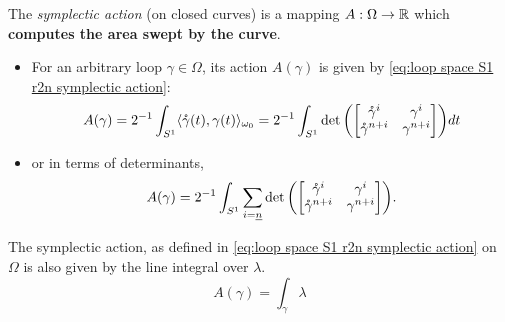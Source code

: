 \documentclass[../main-v2-manifolds.tex]{subfiles}
\begin{document}
\begin{definition}\label{def:symplectic action closed curves}
    The \emph{symplectic action} (on closed curves) is a mapping $A:\Omega\to\mathbb{R}$ which \textbf{computes the area swept by the curve}. 
    \begin{itemize}
        \item For an arbitrary loop $\gamma\in\Omega$, its action $A(\gamma)$ is given by \cref{eq:loop space S1 r2n symplectic action}:
        \begin{equation}
            A(\gamma) = 2^{-1}\int_{S^1}\langle\mathring{\gamma}(t),\gamma(t)\rangle_{\omega_0} = 2^{-1}\int_{S^1}\det\qty(\mqty[\mathring{\gamma}^{i} & \gamma^{i}\\ \mathring{\gamma}^{n+i} & \gamma^{n+i}])dt
            \label{eq:loop space S1 r2n symplectic action}
        \end{equation}
        \item or in terms of determinants, 
        \begin{equation}
            A(\gamma) = 2^{-1}\int_{S^1}\sum_{i=\underline{n}}\det\qty(\mqty[\mathring{\gamma}^i & \gamma^i \\ \mathring{\gamma}^{n+i} & \gamma^{n+i}]).
            \label{eq:loop space S1 r2n symplectic action determinant formula}
        \end{equation}
    \end{itemize}
\end{definition}
\begin{lemma}
    The symplectic action, as defined in \cref{eq:loop space S1 r2n symplectic action} on $\Omega$ is also given by the line integral over $\lambda$.
    \begin{equation}
        A(\gamma) = \int_{\gamma}\lambda
        \label{eq:loop space S1 r2n symplectic action lambda}
    \end{equation}
\end{lemma}
\end{document}

